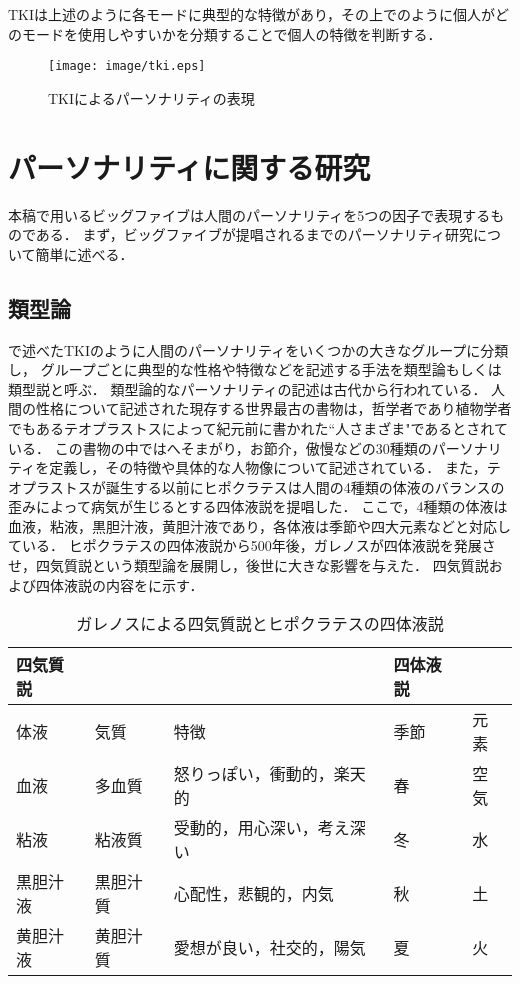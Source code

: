 TKIは上述のように各モードに典型的な特徴があり，その上でのように個人がどのモードを使用しやすいかを分類することで個人の特徴を判断する．
\begin{figure}[htb]
    \centering
    \texttt{[image: image/tki.eps]}
    \caption{TKIによるパーソナリティの表現}
    \label{fig:tki}
\end{figure}

\section{パーソナリティに関する研究}
本稿で用いるビッグファイブは人間のパーソナリティを5つの因子で表現するものである．
まず，ビッグファイブが提唱されるまでのパーソナリティ研究について簡単に述べる\cite{big5-history, psychology, first-personality,daniel}．

\subsection{類型論}
で述べたTKIのように人間のパーソナリティをいくつかの大きなグループに分類し，
グループごとに典型的な性格や特徴などを記述する手法を類型論もしくは類型説と呼ぶ．
類型論的なパーソナリティの記述は古代から行われている．
人間の性格について記述された現存する世界最古の書物は，哲学者であり植物学者でもあるテオプラストスによって紀元前に書かれた“人さまざま"であるとされている．
この書物の中ではへそまがり，お節介，傲慢などの30種類のパーソナリティを定義し，その特徴や具体的な人物像について記述されている\cite{theophrastus}．
また，テオプラストスが誕生する以前にヒポクラテスは人間の4種類の体液のバランスの歪みによって病気が生じるとする四体液説を提唱した\cite{hippocrates}．
ここで，4種類の体液は血液，粘液，黒胆汁液，黄胆汁液であり，各体液は季節や四大元素などと対応している．
ヒポクラテスの四体液説から500年後，ガレノスが四体液説を発展させ，四気質説という類型論を展開し，後世に大きな影響を与えた\cite{smith}．
四気質説および四体液説の内容をに示す．

\begin{table}[htb]
    \centering
    \caption{ガレノスによる四気質説とヒポクラテスの四体液説}
    \begin{tabular}{lll|ll} \hline
        四気質説 & & & 四体液説 & \\ \hline
        体液 & 気質 & 特徴 & 季節 & 元素\\ \hline
        血液 & 多血質 & 怒りっぽい，衝動的，楽天的 & 春 & 空気 \\
        粘液 & 粘液質 & 受動的，用心深い，考え深い & 冬 & 水 \\
        黒胆汁液 & 黒胆汁質 & 心配性，悲観的，内気 & 秋 & 土 \\
        黄胆汁液 & 黄胆汁質 & 愛想が良い，社交的，陽気 & 夏 & 火 \\ \hline
    \end{tabular}
    \label{tab:galenos}
\end{table}

